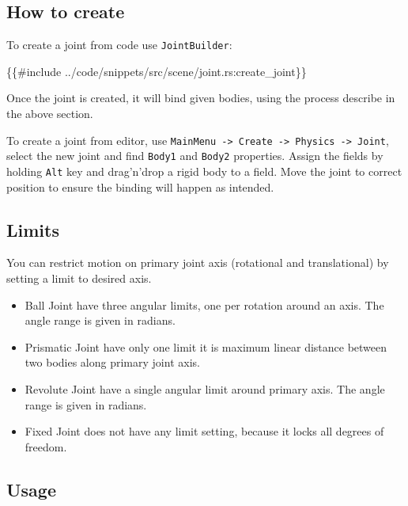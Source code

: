 \documentclass[
]{book}
\newenvironment{Shaded}{\begin{snugshade}}{\end{snugshade}}
\newcommand{\NormalTok}[1]{#1}
\providecommand{\tightlist}{%
  \setlength{\itemsep}{0pt}\setlength{\parskip}{0pt}}
\theoremstyle{definition}
\theoremstyle{definition}
\theoremstyle{definition}
\theoremstyle{definition}
\theoremstyle{remark}
\begin{document}
\subsection{How to create}\label{how-to-create-11}

To create a joint from code use \texttt{JointBuilder}:

\begin{Shaded}
\begin{Highlighting}[]
\NormalTok{\{\{\#include ../code/snippets/src/scene/joint.rs:create\_joint\}\}}
\end{Highlighting}
\end{Shaded}

Once the joint is created, it will bind given bodies, using the process describe in the above section.

To create a joint from editor, use \texttt{MainMenu\ -\textgreater{}\ Create\ -\textgreater{}\ Physics\ -\textgreater{}\ Joint}, select the new joint and find \texttt{Body1} and \texttt{Body2} properties. Assign the fields by holding \texttt{Alt} key and drag'n'drop a rigid body to a field. Move the joint to correct position to ensure the binding will happen as intended.

\subsection{Limits}\label{limits}

You can restrict motion on primary joint axis (rotational and translational) by setting a limit to desired axis.

\begin{itemize}
\tightlist
\item
  Ball Joint have three angular limits, one per rotation around an axis. The angle range is given in radians.
\item
  Prismatic Joint have only one limit it is maximum linear distance between two bodies along primary joint axis.
\item
  Revolute Joint have a single angular limit around primary axis. The angle range is given in radians.
\item
  Fixed Joint does not have any limit setting, because it locks all degrees of freedom.
\end{itemize}

\subsection{Usage}\label{usage-2}
\end{document}

